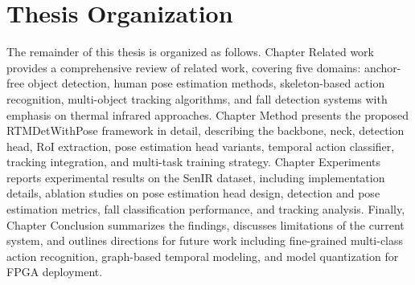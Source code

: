 \section{Thesis Organization}
\label{sec:intro_organization}

The remainder of this thesis is organized as follows. Chapter Related work provides a comprehensive review of related work, covering five domains: anchor-free object detection, human pose estimation methods, skeleton-based action recognition, multi-object tracking algorithms, and fall detection systems with emphasis on thermal infrared approaches. Chapter Method presents the proposed RTMDetWithPose framework in detail, describing the backbone, neck, detection head, RoI extraction, pose estimation head variants, temporal action classifier, tracking integration, and multi-task training strategy. Chapter Experiments reports experimental results on the SenIR dataset, including implementation details, ablation studies on pose estimation head design, detection and pose estimation metrics, fall classification performance, and tracking analysis. Finally, Chapter Conclusion summarizes the findings, discusses limitations of the current system, and outlines directions for future work including fine-grained multi-class action recognition, graph-based temporal modeling, and model quantization for FPGA deployment.